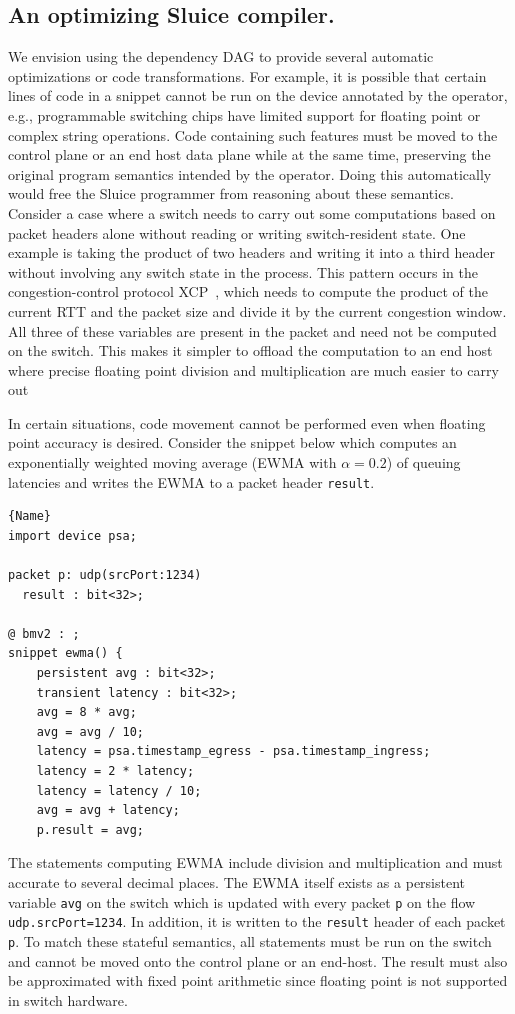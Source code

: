 \documentclass[12pt, oneside]{article}
\begin{document}
\subsection{An optimizing Sluice compiler.} We envision using the dependency DAG to
provide several automatic optimizations or code transformations. For example,
it is possible that certain lines of code in a snippet cannot be run on the
device annotated by the operator, e.g., programmable switching chips have
limited support for floating point or complex string operations. Code
containing such features must be moved to the control plane or an end host data
plane while at the same time, preserving the original program semantics
intended by the operator. Doing this automatically would free the Sluice
programmer from reasoning about these semantics. Consider a case where a switch needs to carry out some computations based on packet headers alone without reading or writing switch-resident state. One example is taking the product of two headers and writing it into a third header without involving any switch state in the process. This pattern occurs in the congestion-control protocol XCP~\cite{xcp}, which needs to compute the product of the current RTT and the packet size and divide it by the current congestion window. All three of these variables are present in the packet and need not be computed on the switch. This makes it simpler to offload the computation to an end host where precise floating point division and multiplication are much easier to carry out~\cite{sharma}

In certain situations, code movement cannot be performed even when floating point accuracy is desired. Consider the snippet below which computes an exponentially weighted moving average (EWMA with $\alpha=0.2$) of queuing latencies and writes the EWMA to a packet header \texttt{result}. 

\begin{lstlisting}[frame=tlrb, basicstyle=\linespread{1.3}\scriptsize]{Name}
import device psa;

packet p: udp(srcPort:1234)
  result : bit<32>;

@ bmv2 : ;
snippet ewma() {
    persistent avg : bit<32>;
    transient latency : bit<32>;
    avg = 8 * avg;
    avg = avg / 10;
    latency = psa.timestamp_egress - psa.timestamp_ingress;
    latency = 2 * latency;
    latency = latency / 10;
    avg = avg + latency;
    p.result = avg;
\end{lstlisting}

The statements computing EWMA include division and multiplication and must accurate to several decimal places. The EWMA itself exists as a persistent variable \texttt{avg} on the switch which is updated with every packet \texttt{p} on the flow \texttt{udp.srcPort=1234}. In addition, it is written to the \texttt{result} header of each packet \texttt{p}. To match these stateful semantics, all statements must be run on the switch and cannot be moved onto the control plane or an end-host. The result must also be approximated with fixed point arithmetic since floating point is not supported in switch hardware. 
\end{document}
